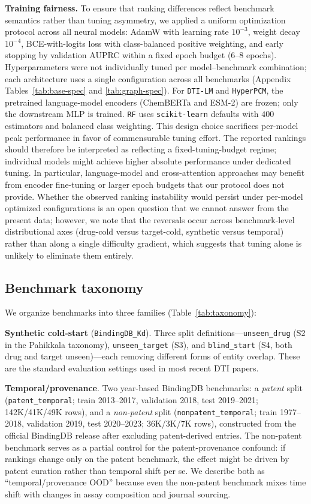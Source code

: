 \documentclass[referee,pdflatex,sn-basic,Numbered]{sn-jnl}
\newcommand{\AUPRC}{AUPRC}
\begin{document}
\textbf{Training fairness.} To ensure that ranking differences reflect benchmark semantics rather than tuning asymmetry, we applied a uniform optimization protocol across all neural models: AdamW with learning rate $10^{-3}$, weight decay $10^{-4}$, BCE-with-logits loss with class-balanced positive weighting, and early stopping by validation \AUPRC{} within a fixed epoch budget (6--8 epochs). Hyperparameters were not individually tuned per model--benchmark combination; each architecture uses a single configuration across all benchmarks (Appendix Tables~\ref{tab:base-spec} and \ref{tab:graph-spec}). For \texttt{DTI-LM} and \texttt{HyperPCM}, the pretrained language-model encoders (ChemBERTa and ESM-2) are frozen; only the downstream MLP is trained. \texttt{RF} uses \texttt{scikit-learn} defaults with $400$ estimators and balanced class weighting. This design choice sacrifices per-model peak performance in favor of commensurable tuning effort. The reported rankings should therefore be interpreted as reflecting a fixed-tuning-budget regime; individual models might achieve higher absolute performance under dedicated tuning. In particular, language-model and cross-attention approaches may benefit from encoder fine-tuning or larger epoch budgets that our protocol does not provide. Whether the observed ranking instability would persist under per-model optimized configurations is an open question that we cannot answer from the present data; however, we note that the reversals occur across benchmark-level distributional axes (drug-cold versus target-cold, synthetic versus temporal) rather than along a single difficulty gradient, which suggests that tuning alone is unlikely to eliminate them entirely.

\subsection{Benchmark taxonomy}

We organize benchmarks into three families (Table~\ref{tab:taxonomy}):

\textbf{Synthetic cold-start} (\texttt{BindingDB\_Kd}). Three split definitions—\texttt{unseen\_drug} (S2 in the Pahikkala taxonomy), \texttt{unseen\_target} (S3), and \texttt{blind\_start} (S4, both drug and target unseen)—each removing different forms of entity overlap. These are the standard evaluation settings used in most recent DTI papers.

\textbf{Temporal/provenance}. Two year-based BindingDB benchmarks: a \emph{patent} split (\texttt{patent\_temporal}; train 2013--2017, validation 2018, test 2019--2021; 142K/41K/49K rows), and a \emph{non-patent} split (\texttt{nonpatent\_temporal}; train 1977--2018, validation 2019, test 2020--2023; 36K/3K/7K rows), constructed from the official BindingDB release after excluding patent-derived entries. The non-patent benchmark serves as a partial control for the patent-provenance confound: if rankings change only on the patent benchmark, the effect might be driven by patent curation rather than temporal shift per se. We describe both as ``temporal/provenance OOD'' because even the non-patent benchmark mixes time shift with changes in assay composition and journal sourcing.
\end{document}

